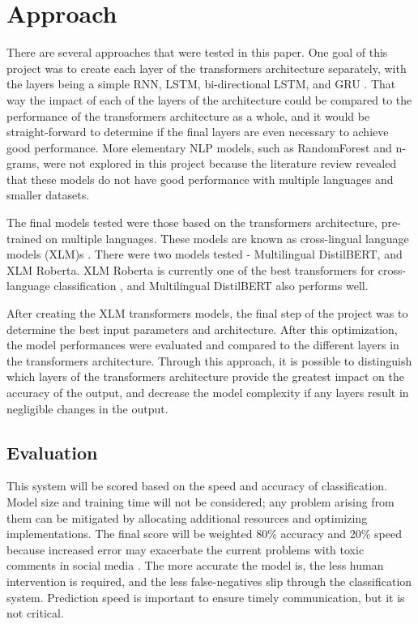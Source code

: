 \documentclass{article}
\begin{document}
\section{Approach}

There are several approaches that were tested in this paper. One goal of this project was to create each layer of the transformers architecture separately, with the layers being a simple RNN, LSTM, bi-directional LSTM, and GRU \cite{lample2019crosslingual}. That way the impact of each of the layers of the architecture could be compared to the performance of the transformers architecture as a whole, and it would be straight-forward to determine if the final layers are even necessary to achieve good performance. More elementary NLP models, such as RandomForest and n-grams, were not explored in this project because the literature review revealed that these models do not have good performance with multiple languages and smaller datasets.

The final models tested were those based on the transformers architecture, pre-trained on multiple languages. These models are known as cross-lingual language models (XLM)s \cite{lample2019crosslingual}. There were two models tested - Multilingual DistilBERT, and XLM Roberta. XLM Roberta is currently one of the best transformers for cross-language classification \cite{deep_learning_approaches}, and Multilingual DistilBERT also performs well.

After creating the XLM transformers models, the final step of the project was to determine the best input parameters and architecture. After this optimization, the model performances were evaluated and compared to the different layers in the transformers architecture. Through this approach, it is possible to distinguish which layers of the transformers architecture provide the greatest impact on the accuracy of the output, and decrease the model complexity if any layers result in negligible changes in the output.

\subsection{Evaluation}

This system will be scored based on the speed and accuracy of classification. Model size and training time will not be considered; any problem arising from them can be mitigated by allocating additional resources and optimizing implementations. The final score will be weighted 80\% accuracy and 20\% speed because increased error may exacerbate the current problems with toxic comments in social media \cite{10.1145/3200947.3208069}. The more accurate the model is, the less human intervention is required, and the less false-negatives slip through the classification system. Prediction speed is important to ensure timely communication, but it is not critical.
\end{document}
